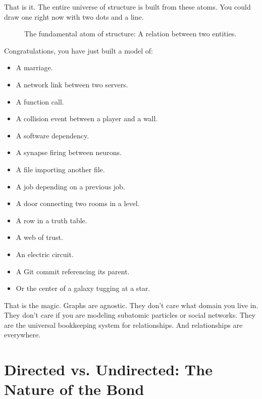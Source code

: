 That is it. The entire universe of structure is built from these atoms. You could draw one right now with two dots and a line.

\begin{figure}[h]
    \centering
    \caption{The fundamental atom of structure: A relation between two entities.}
    \label{fig:simple_graph}
\end{figure}

Congratulations, you have just built a model of:
\begin{itemize}
    \item A marriage.
    \item A network link between two servers.
    \item A function call.
    \item A collision event between a player and a wall.
    \item A software dependency.
    \item A synapse firing between neurons.
    \item A file importing another file.
    \item A job depending on a previous job.
    \item A door connecting two rooms in a level.
    \item A row in a truth table.
    \item A web of trust.
    \item An electric circuit.
    \item A Git commit referencing its parent.
    \item Or the center of a galaxy tugging at a star.
\end{itemize}

That is the magic. Graphs are agnostic. They don't care what domain you live in. They don't care if you are modeling subatomic particles or social networks. They are the universal bookkeeping system for relationships. And relationships are everywhere.

\section{Directed vs. Undirected: The Nature of the Bond}
\label{sec:directed-vs-undirected}

